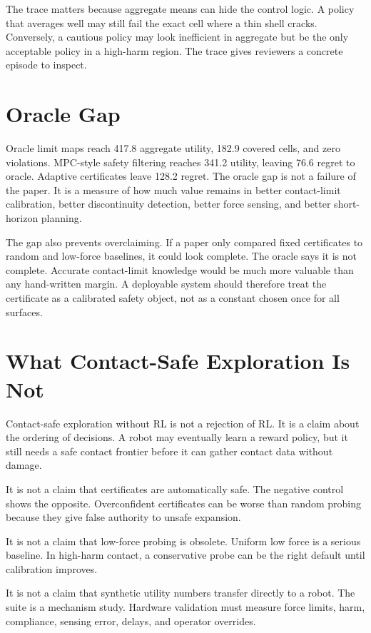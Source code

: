 \documentclass{article}
\begin{document}
The trace matters because aggregate means can hide the control logic. A policy
that averages well may still fail the exact cell where a thin shell cracks.
Conversely, a cautious policy may look inefficient in aggregate but be the only
acceptable policy in a high-harm region. The trace gives reviewers a concrete
episode to inspect.

\section{Oracle Gap}

Oracle limit maps reach 417.8 aggregate utility, 182.9 covered cells, and zero
violations. MPC-style safety filtering reaches 341.2 utility, leaving 76.6
regret to oracle. Adaptive certificates leave 128.2 regret. The oracle gap is
not a failure of the paper. It is a measure of how much value remains in better
contact-limit calibration, better discontinuity detection, better force
sensing, and better short-horizon planning.

The gap also prevents overclaiming. If a paper only compared fixed
certificates to random and low-force baselines, it could look complete. The
oracle says it is not complete. Accurate contact-limit knowledge would be much
more valuable than any hand-written margin. A deployable system should
therefore treat the certificate as a calibrated safety object, not as a
constant chosen once for all surfaces.

\section{What Contact-Safe Exploration Is Not}

Contact-safe exploration without RL is not a rejection of RL. It is a claim
about the ordering of decisions. A robot may eventually learn a reward policy,
but it still needs a safe contact frontier before it can gather contact data
without damage.

It is not a claim that certificates are automatically safe. The negative
control shows the opposite. Overconfident certificates can be worse than random
probing because they give false authority to unsafe expansion.

It is not a claim that low-force probing is obsolete. Uniform low force is a
serious baseline. In high-harm contact, a conservative probe can be the right
default until calibration improves.

It is not a claim that synthetic utility numbers transfer directly to a robot.
The suite is a mechanism study. Hardware validation must measure force limits,
harm, compliance, sensing error, delays, and operator overrides.
\end{document}
